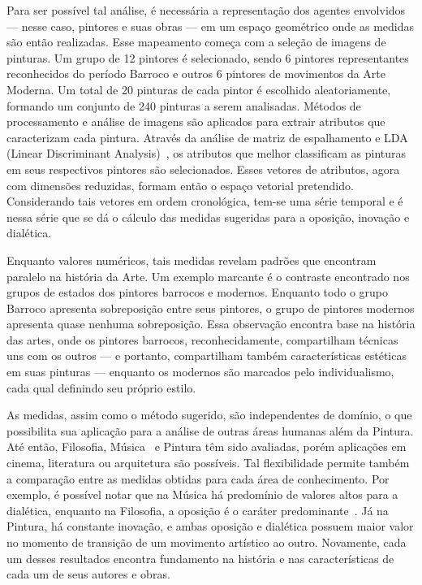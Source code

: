 Para ser possível tal análise, é necessária a representação dos
agentes envolvidos --- nesse caso, pintores e suas obras --- em um
espaço geométrico onde as medidas são então realizadas. Esse
mapeamento começa com a seleção de imagens de pinturas. Um grupo de 12
pintores é selecionado, sendo 6 pintores representantes reconhecidos
do período Barroco e outros 6 pintores de movimentos da Arte
Moderna. Um total de 20 pinturas de cada pintor é escolhido
aleatoriamente, formando um conjunto de 240 pinturas a serem
analisadas. Métodos de processamento e análise de imagens são
aplicados para extrair atributos que caracterizam cada
pintura. Através da análise de matriz de espalhamento e LDA (Linear
Discriminant Analysis)~\cite{luciano,fisher}, os atributos que melhor
classificam as pinturas em seus respectivos pintores são
selecionados. Esses vetores de atributos, agora com dimensões
reduzidas, formam então o espaço vetorial pretendido. Considerando
tais vetores em ordem cronológica, tem-se uma série temporal e é nessa
série que se dá o cálculo das medidas sugeridas para a oposição,
inovação e dialética.

Enquanto valores numéricos, tais medidas revelam padrões que encontram
paralelo na história da Arte. Um exemplo marcante é o contraste
encontrado nos grupos de estados dos pintores barrocos e
modernos. Enquanto todo o grupo Barroco apresenta sobreposição entre
seus pintores, o grupo de pintores modernos apresenta quase nenhuma
sobreposição. Essa observação encontra base na história das artes,
onde os pintores barrocos, reconhecidamente, compartilham técnicas uns
com os outros --- e portanto, compartilham também características
estéticas em suas pinturas --- enquanto os modernos são marcados pelo
individualismo, cada qual definindo seu próprio estilo.

As medidas, assim como o método sugerido, são independentes de
domínio, o que possibilita sua aplicação para a análise de outras
áreas humanas além da Pintura. Até então, Filosofia,
Música~\cite{vieira} e Pintura têm sido avaliadas, porém aplicações em
cinema, literatura ou arquitetura são possíveis. Tal flexibilidade
permite também a comparação entre as medidas obtidas para cada área de
conhecimento. Por exemplo, é possível notar que na Música há
predomínio de valores altos para a dialética, enquanto na Filosofia, a
oposição é o caráter predominante~\cite{vieira}. Já na Pintura, há
constante inovação, e ambas oposição e dialética possuem maior valor
no momento de transição de um movimento artístico ao outro. Novamente,
cada um desses resultados encontra fundamento na história e nas
características de cada um de seus autores e obras.


